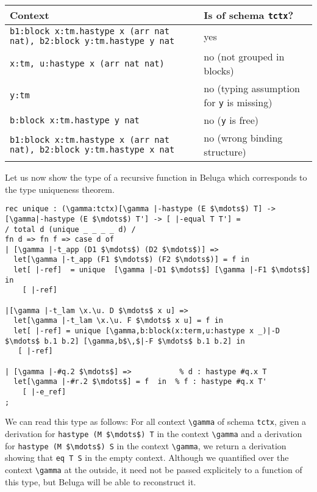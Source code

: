 \begin{center}
\begin{tabular}{p{7.5cm}|p{8cm}}
\hspace{2cm}Context & \hspace{1.5cm}Is of schema \lstinline!tctx!?\\
\hline 
\lstinline!b1:block x:tm.hastype x (arr nat nat), b2:block y:tm.hastype y nat!
& yes \\ \hline
\lstinline!x:tm, u:hastype x (arr nat nat)! & no (not grouped in blocks)
\\\hline
\lstinline!y:tm! & no (typing assumption for \lstinline!y! is
missing) \\\hline
\lstinline!b:block x:tm.hastype y nat! & no (\lstinline!y! is free) \\
\hline
\lstinline!b1:block x:tm.hastype x (arr nat nat), b2:block y:tm.hastype x nat! 
& no (wrong binding structure)
\end{tabular}  
\end{center}



Let us now show the type of a recursive function in Beluga which
corresponds to the type uniqueness theorem.


\begin{lstlisting}[caption={Type Uniqueness Proof},label=list:8-6,captionpos=b,float,abovecaptionskip=-\medskipamount]
rec unique : (\gamma:tctx)[\gamma |-hastype (E $\mdots$) T] -> [\gamma|-hastype (E $\mdots$) T'] -> [ |-equal T T'] =  
/ total d (unique _ _ _ _ d) /
fn d => fn f => case d of
| [\gamma |-t_app (D1 $\mdots$) (D2 $\mdots$)] =>
  let[\gamma |-t_app (F1 $\mdots$) (F2 $\mdots$)] = f in
  let[ |-ref]  = unique  [\gamma |-D1 $\mdots$] [\gamma |-F1 $\mdots$] in
    [ |-ref]

|[\gamma |-t_lam \x.\u. D $\mdots$ x u] =>
  let[\gamma |-t_lam \x.\u. F $\mdots$ x u] = f in
  let[ |-ref] = unique [\gamma,b:block(x:term,u:hastype x _)|-D $\mdots$ b.1 b.2] [\gamma,b$\,$|-F $\mdots$ b.1 b.2] in
   [ |-ref]

| [\gamma |-#q.2 $\mdots$] =>           % d : hastype #q.x T
  let[\gamma |-#r.2 $\mdots$] = f  in  % f : hastype #q.x T'
    [ |-e_ref]
; 
\end{lstlisting}


We can read this type as follows: For all context \lstinline!\gamma! of
schema \lstinline!tctx!, given a derivation for 
\lstinline!hastype (M $\mdots$) T! in the context \lstinline!\gamma! and a derivation for 
\lstinline!hastype (M $\mdots$) S! in the context \lstinline!\gamma!, we return a
derivation showing that \lstinline!eq T S! in the empty context.
Although we quantified over the context \lstinline!\gamma! at the outside,
it need not be passed explicitely to a function of this type, but
Beluga will be able to reconstruct it. 

